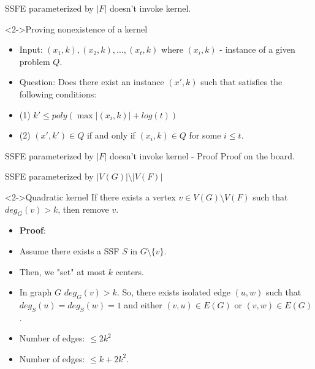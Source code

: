 \documentclass{beamer}
\begin{document}
\begin{frame}[t]{SSFE parameterized by $|F|$ doesn't invoke kernel.}
	\small
	\begin{block}<2->{Proving nonexistence of a kernel}
		\setlength{\leftmargini}{2pt}
		\begin{itemize}[<+(1)->]
			\item[] Input: $(x_1,k),(x_2,k),...,(x_t,k)$ where $(x_i,k)$ - instance of a given problem $Q$.
			\item[] Question: Does there exist an instance $(x',k)$ such that satisfies the following conditions:
			\item[] (1) $k' \leq poly(\max |(x_i,k)| + log(t))$
			\item[] (2) $(x',k') \in Q$ if and only if $(x_i,k) \in Q$ for some $i \leq t$.
		\end{itemize}
	\end{block}
\end{frame}

\begin{frame}{SSFE parameterized by $|F|$ doesn't invoke kernel - Proof}
	\huge\centering
	Proof on the board.
\end{frame}

\begin{frame}[t]{SSFE parameterized by $|V(G)| \setminus |V(F)|$}
	\begin{block}<2->{Quadratic kernel}
		If there exists a vertex $v \in V(G) \setminus V(F)$ such that $deg_G(v) > k$, then remove $v$.
	\end{block}
	\setlength{\leftmargini}{2pt}
	\begin{itemize}[<+(2)->]
		\item[] \textbf{Proof}:
		\item[] Assume there exists a SSF $S$ in $G \setminus \{v\}$.
		\item[] Then, we "set" at most $k$ centers.
		\item[] In graph $G$ $deg_G(v)>k$. So, there exists isolated edge $(u,w)$ such that $deg_S(u)=deg_S(w)=1$ and either $(v,u) \in E(G)$ or $(v,w) \in E(G)$.
		\bigskip
		\item[] Number of edges: $\leq 2k^2$
		\item[] Number of edges: $\leq k + 2k^2$.
	\end{itemize}
\end{frame}
\end{document}
